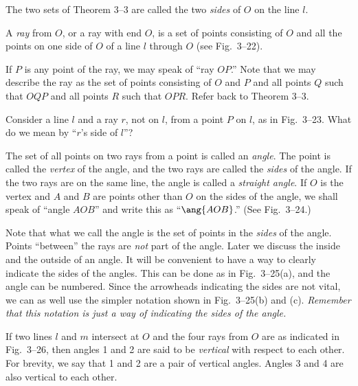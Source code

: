 \documentclass[11pt]{book}
\theoremstyle{bkplain}
\theoremstyle{XIplainnote}
\theoremstyle{bkplain}
\theoremstyle{bkplain}
\begin{document}
\begin{definition}
The two sets of Theorem 3--3 are called the two \emph{sides} of $O$ on the line
$l$.
\end{definition}

\begin{definition}
A \emph{ray} from $O$, or a ray with end $O$, is a set of points consisting of
$O$ and all the points on one side of $O$ of a line $l$ through $O$ (see
Fig.~3--22).
\end{definition}

If $P$ is any point of the ray, we may speak of ``ray $OP$.'' Note that we may
describe the ray as the set of points consisting of $O$ and $P$ and all points
$Q$ such that $OQP$ and all points $R$ such that $OPR$. Refer back to
Theorem 3--3.

\FIGIIITWENTYTWOTWENTYTHREE

Consider a line $l$ and a ray $r$, not on $l$, from a point $P$ on $l$, as in
Fig.~3--23. What do we mean by ``$r$'s side of $l$''?

\begin{definition}
The set of all points on two rays from a point is called an \emph{angle}. The
point is called the \emph{vertex} of the angle, and the two rays are called the
\emph{sides} of the angle. If the two rays are on the same line, the angle is
called a \emph{straight angle}. If $O$ is the vertex and $A$ and $B$ are points
other than $O$ on the sides of the angle, we shall speak of ``angle $AOB$'' and
write this as ``$\ang{AOB}$.'' (See Fig.~3--24.)
\end{definition}

\FIGIIITWENTYFOURTWENTYFIVE

\begin{remark}
Note that what we call the angle is the set of points in the \emph{sides} of the
angle. Points ``between'' the rays are \emph{not} part of the angle. Later we
discuss the inside and the outside of an angle. It will be convenient to have a
way to clearly indicate the sides of the angles. This can be done as in
Fig.~3--25(a), and the angle can be numbered. Since the arrowheads indicating the
sides are not vital, we can as well use the simpler notation shown in
Fig.~3--25(b) and (c). \emph{Remember that this notation is just a way of
indicating the sides of the angle.}
\end{remark}

\begin{definition}
If two lines $l$ and $m$ intersect at $O$ and the four rays from $O$ are as
indicated in Fig.~3--26, then angles 1 and 2 are said to be \emph{vertical} with
respect to each other. For brevity, we say that 1 and 2 are a pair of vertical
angles. Angles 3 and 4 are also vertical to each other.
\end{definition}
\end{document}
